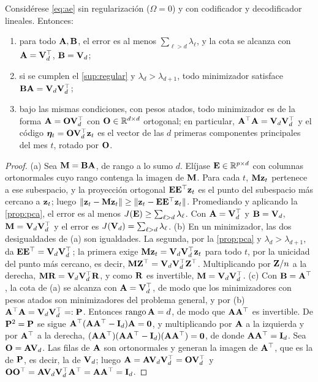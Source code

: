 \begin{proposicion}\label{prop:ae-lineal}
Considérese \cref{eq:ae} sin regularización ($\Omega=0$) y con codificador y decodificador
lineales. Entonces:
\begin{enumerate}[label=(\alph*)]
  \item para todo $\mathbf{A},\mathbf{B}$, el error es al menos $\sum_{\ell>d}\lambda_\ell$, y la cota se
    alcanza con $\mathbf{A}=\mathbf{V}_d^{\top}$, $\mathbf{B}=\mathbf{V}_d$;
  \item si se cumplen el \cref{sup:regular} y $\lambda_d>\lambda_{d+1}$, todo minimizador
    satisface $\mathbf{B}\mathbf{A}=\mathbf{V}_d\mathbf{V}_d^{\top}$;
  \item bajo las mismas condiciones, con pesos atados, todo minimizador es de la forma
    $\mathbf{A}=\mathbf{O}\mathbf{V}_d^{\top}$ con $\mathbf{O}\in\mathbb{R}^{d\times d}$ ortogonal; en particular,
    $\mathbf{A}^{\top}\mathbf{A}=\mathbf{V}_d\mathbf{V}_d^{\top}$ y el código $\boldsymbol{\eta}_t=\mathbf{O}\mathbf{V}_d^{\top}\mathbf{z}_t$ es el vector de las $d$
    primeras componentes principales del mes $t$, rotado por $\mathbf{O}$.
\end{enumerate}
\end{proposicion}

\begin{proof}
(a) Sea $\mathbf{M}=\mathbf{B}\mathbf{A}$, de rango a lo sumo $d$. Elíjase $\mathbf{E}\in\mathbb{R}^{p\times d}$ con columnas
ortonormales cuyo rango contenga la imagen de $\mathbf{M}$. Para cada $t$, $\mathbf{M}\mathbf{z}_t$ pertenece a ese
subespacio, y la proyección ortogonal $\mathbf{E}\mathbf{E}^{\top}\mathbf{z}_t$ es el punto del subespacio más cercano a
$\mathbf{z}_t$; luego $\lVert \mathbf{z}_t-\mathbf{M}\mathbf{z}_t\rVert\ge\lVert \mathbf{z}_t-\mathbf{E}\mathbf{E}^{\top}\mathbf{z}_t\rVert$. Promediando y aplicando la
\cref{prop:pca}, el error es al menos $J(\mathbf{E})\ge\sum_{\ell>d}\lambda_\ell$. Con $\mathbf{A}=\mathbf{V}_d^{\top}$ y
$\mathbf{B}=\mathbf{V}_d$, $\mathbf{M}=\mathbf{V}_d\mathbf{V}_d^{\top}$ y el error es $J(\mathbf{V}_d)=\sum_{\ell>d}\lambda_\ell$.
(b) En un minimizador, las dos desigualdades de (a) son igualdades. La segunda, por la
\cref{prop:pca} y $\lambda_d>\lambda_{d+1}$, da $\mathbf{E}\mathbf{E}^{\top}=\mathbf{V}_d\mathbf{V}_d^{\top}$; la primera exige
$\mathbf{M}\mathbf{z}_t=\mathbf{V}_d\mathbf{V}_d^{\top}\mathbf{z}_t$ para todo $t$, por la unicidad del punto más cercano, es decir, $\mathbf{M}\mathbf{Z}^{\top}=\mathbf{V}_d\mathbf{V}_d^{\top}\mathbf{Z}^{\top}$.
Multiplicando por $\mathbf{Z}/n$ a la derecha, $\mathbf{M}\mathbf{R}=\mathbf{V}_d\mathbf{V}_d^{\top}\mathbf{R}$, y como $\mathbf{R}$ es invertible,
$\mathbf{M}=\mathbf{V}_d\mathbf{V}_d^{\top}$. (c) Con $\mathbf{B}=\mathbf{A}^{\top}$, la cota de (a) se alcanza con $\mathbf{A}=\mathbf{V}_d^{\top}$, de
modo que los minimizadores con pesos atados son minimizadores del problema general, y por (b)
$\mathbf{A}^{\top}\mathbf{A}=\mathbf{V}_d\mathbf{V}_d^{\top}=:\mathbf{P}$. Entonces $\operatorname{rango}\mathbf{A}=d$, de modo que $\mathbf{A}\mathbf{A}^{\top}$ es invertible.
De $\mathbf{P}^2=\mathbf{P}$ se sigue $\mathbf{A}^{\top}(\mathbf{A}\mathbf{A}^{\top}-\mathbf{I}_d)\mathbf{A}=\mathbf{0}$, y multiplicando por $\mathbf{A}$ a
la izquierda y por $\mathbf{A}^{\top}$ a la derecha, $(\mathbf{A}\mathbf{A}^{\top})(\mathbf{A}\mathbf{A}^{\top}-\mathbf{I}_d)(\mathbf{A}\mathbf{A}^{\top})=
\mathbf{0}$, de donde $\mathbf{A}\mathbf{A}^{\top}=\mathbf{I}_d$. Sea $\mathbf{O}=\mathbf{A}\mathbf{V}_d$. Las filas de $\mathbf{A}$ son ortonormales y
generan la imagen de $\mathbf{A}^{\top}$, que es la de $\mathbf{P}$, es decir, la de $\mathbf{V}_d$; luego
$\mathbf{A}=\mathbf{A}\mathbf{V}_d\mathbf{V}_d^{\top}=\mathbf{O}\mathbf{V}_d^{\top}$ y $\mathbf{O}\mathbf{O}^{\top}=\mathbf{A}\mathbf{V}_d\mathbf{V}_d^{\top}\mathbf{A}^{\top}=\mathbf{A}\mathbf{A}^{\top}=\mathbf{I}_d$.
\end{proof}

